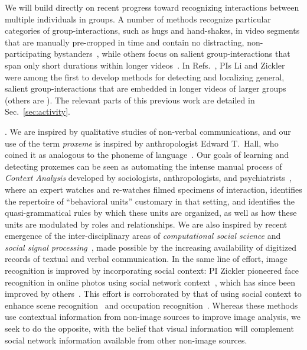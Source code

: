 We will build directly on recent progress toward recognizing interactions between multiple individuals in groups. A number of methods recognize particular categories of group-interactions, such as hugs and hand-shakes, in video segments that are manually pre-cropped in time and contain no distracting, non-participating bystanders~\cite{Intille:act,Patron-PerezMRZ12,PrabhakarR12}, while others focus on salient group-interactions that span only short durations within longer videos~\cite{Hongeng:act,Hakeem:act,Choi:recogtrack, Ryoo:group, Regh2013}. In Refs.~\cite{groupdet2013,LiIJCV2012,Li2010}, PIs Li and Zickler were among the first  to develop methods  for detecting and localizing general, salient group-interactions that are embedded in longer videos of larger groups (others are \cite{Cristani:fformation,Amer:group}). The  relevant parts of this previous work are detailed in Sec.~\ref{sec:activity}.


. We are inspired by qualitative studies of non-verbal communications, and our use of the term \emph{proxeme} is inspired by anthropologist Edward T.~Hall, who coined it as analogous to the phoneme of language~\cite{hall1974}. Our goals of learning and detecting proxemes can be seen as automating the intense manual process of \emph{Context Analysis} developed by sociologists, anthropologists, and psychiatrists~\cite{Kendon1990}, where an expert watches and re-watches filmed specimens of interaction, identifies the repertoire of ``behavioral units'' customary in that setting, and identifies the quasi-grammatical rules by which these units are organized, as well as how these units are modulated by roles and relationships. We are also inspired by recent emergence of the inter-disciplinary areas of \emph{computational social science} \cite{Lazer2009} and \emph{social signal processing}~\cite{Pantic}, made possible by the increasing availability of digitized records of textual and verbal communication. In the same line of effort, image recognition is improved by incorporating social context: PI Zickler pioneered face recognition in online photos using social network context~\cite{Stone2008,Stone2010}, which has since been improved by others~\cite{Dikmen:classify,Poppe2012,LeeBMVC2011,hanalbum2013album}. This effort is corroborated by that of using social context to enhance scene recognition~\cite{McAuley:socialclassify} and occupation recognition~\cite{occupation2013}. Whereas these methods use contextual information from non-image sources to improve image analysis, we seek to do the opposite, with the belief that visual information will complement social network information available from other non-image sources. 

